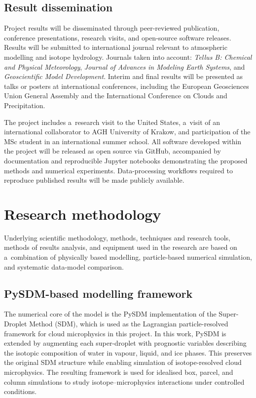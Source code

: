 \documentclass[12pt]{article}
\begin{document}
\subsection*{Result dissemination}
Project results will be disseminated through peer-reviewed publication,
conference presentations, research visits, and open-source software releases.
Results will be submitted to international journal relevant to atmospheric
modelling and isotope hydrology.
Journals taken into account: \emph{Tellus B: Chemical and Physical
Meteorology},
\emph{Journal of Advances in Modeling Earth Systems}, and
\emph{Geoscientific Model Development}.
Interim and final results will be presented as talks or posters at
international conferences, including the European Geosciences Union General
Assembly and the International Conference on Clouds and Precipitation.

The project includes a~research visit to the United States, a~visit of an
international collaborator to AGH University of Krakow, and participation of the MSc
student in an international summer school.
All software developed within the project will be released as open source via
GitHub, accompanied by documentation and reproducible Jupyter notebooks
demonstrating the proposed methods and numerical experiments.
Data-processing
workflows required to reproduce published results will be made publicly
available.


\section{Research methodology}
Underlying scientific methodology, methods, techniques and research tools,
methods of results analysis, and equipment used in the research are based 
on a~combination of physically based modelling, particle-based numerical simulation,
and systematic data-model comparison.

\subsection*{PySDM-based modelling framework}
The numerical core of the model is the PySDM implementation of the Super-Droplet Method (SDM),
which is used as the Lagrangian particle-resolved framework 
for cloud microphysics in this project.
In this work, PySDM is extended by augmenting each super-droplet with prognostic variables
describing the isotopic composition of water in vapour, liquid, and ice phases.
This preserves the original SDM structure while enabling simulation of isotope-resolved
cloud microphysics.
The resulting framework is used for idealised box, parcel, and column simulations
to study isotope–microphysics interactions under controlled conditions.
\end{document}

